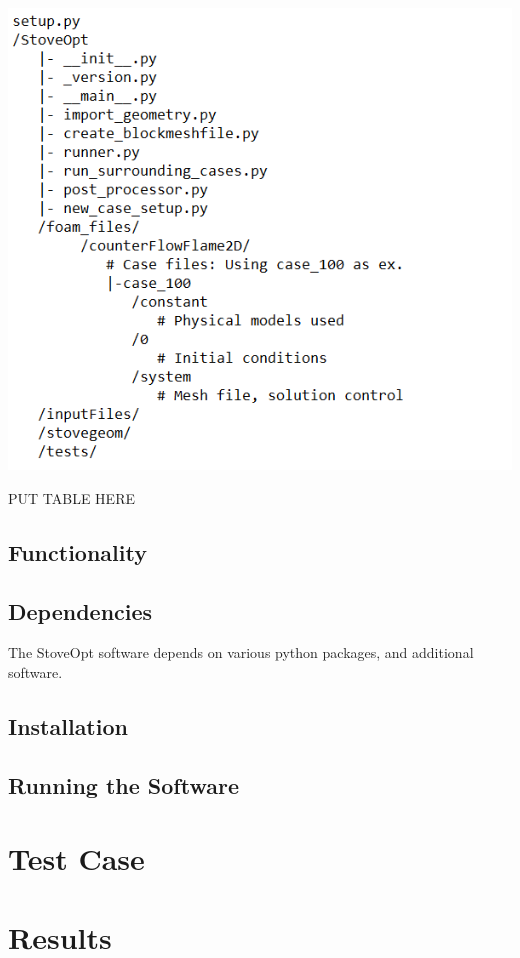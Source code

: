 \documentclass[3p,times,twocolumn]{elsarticle}
\begin{document}
\includegraphics{skeleton.PNG}

	PUT TABLE HERE



\subsection{Functionality}



\subsection{Dependencies}
The StoveOpt software depends on various python packages, and additional software. 


\subsection{Installation}

\subsection{Running the Software}

\section{Test Case}

\section{Results}
%
\end{document}
